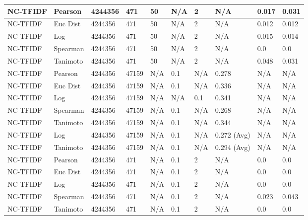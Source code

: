 \documentclass{article}
\begin{document}
\begin{longtable}{ |p{1.7cm}|p{1.9cm}|p{1.5cm}|p{1.5cm}|p{0.75cm}|p{0.75cm}|p{0.75cm}|p{0.75cm}|p{1.5cm}|p{1.5cm}|}
    NC-TFIDF  & Pearson & 4244356 & 471 & 50 & N/A  & 2 & N/A & 0.017 & 0.031  \\ \hline
    NC-TFIDF  & Euc Dist & 4244356 & 471 & 50 & N/A  & 2 & N/A &0.012 & 0.012   \\ \hline
    NC-TFIDF  & Log & 4244356 & 471 & 50 & N/A & 2 & N/A & 0.015 & 0.014  \\ \hline
    NC-TFIDF  & Spearman & 4244356 & 471& 50 & N/A  & 2 & N/A &0.0 & 0.0 \\ \hline
    NC-TFIDF  & Tanimoto & 4244356 & 471 & 50 & N/A  & 2 & N/A & 0.048 & 0.031 \\ \hline
   
    NC-TFIDF & Pearson & 4244356 & 47159 & N/A & 0.1 & N/A & 0.278 & N/A & N/A  \\ \hline
    NC-TFIDF  & Euc Dist & 4244356 & 47159 & N/A & 0.1 & N/A & 0.336 & N/A & N/A   \\ \hline
    NC-TFIDF  & Log & 4244356 & 47159 & N/A &  N/A & 0.1 & 0.341 & N/A & N/A  \\ \hline
    NC-TFIDF  & Spearman & 4244356 & 47159 & N/A & 0.1 & N/A & 0.268 & N/A & N/A \\ \hline
    NC-TFIDF  & Tanimoto & 4244356 & 47159 & N/A & 0.1 & N/A & 0.344 & N/A & N/A \\ \hline
    NC-TFIDF  & Log & 4244356 & 47159 & N/A & 0.1 & N/A & 0.272 (Avg) & N/A & N/A \\ \hline
    NC-TFIDF  & Tanimoto & 4244356 & 47159 & N/A & 0.1 & N/A & 0.294 (Avg) & N/A & N/A \\ \hline
    
    NC-TFIDF  & Pearson & 4244356 & 471 & N/A & 0.1 & 2 & N/A & 0.0 & 0.0  \\ \hline
    NC-TFIDF  & Euc Dist & 4244356 & 471 & N/A & 0.1 & 2 & N/A &0.0 & 0.0   \\ \hline
    NC-TFIDF  & Log & 4244356 & 471 & N/A & 0.1 & 2 & N/A & 0.0 & 0.0  \\ \hline
    NC-TFIDF  & Spearman & 4244356 & 471 & N/A & 0.1 & 2 & N/A &0.023 & 0.043 \\ \hline
    NC-TFIDF  & Tanimoto & 4244356 & 471 & N/A & 0.1 & 2 & N/A & 0.0 & 0.0 \\ \hline
    

\end{longtable}
\end{document}
